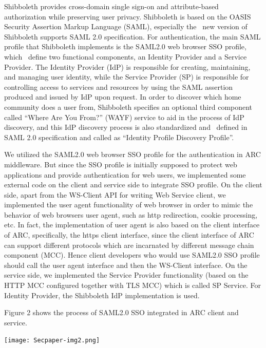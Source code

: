 \documentclass{article}
\begin{document}
Shibboleth provides cross-domain single sign-on and attribute-based
authorization while preserving user privacy. Shibboleth is based on the
OASIS Security Assertion Markup Language (SAML), especially the \ new
version of Shibboleth supports SAML 2.0 specification. For
authentication, the main SAML profile that Shibboleth implements is the
SAML2.0 web browser SSO profile, which \ define two functional
components, an Identity Provider and a Service Provider. The Identity
Provider (IdP) is responsible for creating, maintaining, and managing
user identity, while the Service Provider (SP) is responsible for
controlling access to services and resources by using the SAML
assertion produced and issued by IdP upon request. In order to discover
which home community does a user from, Shibboleth specifies an optional
third component called {\textquotedblleft}Where Are You
From?{\textquotedblright} (WAYF) service to aid in the process of IdP
discovery, and this IdP discovery process is also standardized and
\ defined in SAML 2.0 specification and called as
{\textquotedblleft}Identity Profile Discovery
Profile{\textquotedblright}.

We utilized the SAML2.0 web browser SSO profile for the authentication
in ARC middleware. But since the SSO profile is initially supposed to
protect web applications and provide authentication for web users, we
implemented some external code on the client and service side to
integrate SSO profile. On the client side, apart from the WS-Client API
for writing Web Service client, we implemented the user agent
functionality of web browser in order to mimic the behavior of web
browser{\textquotesingle}s user agent, such as http redirection, cookie
processing, etc. In fact, the implementation of user agent is also
based on the client interface of ARC, specifically, the https client
interface, since the client interface of ARC can support different
protocols which are incarnated by different message chain component
(MCC). Hence client developers who would use SAML2.0 SSO profile should
call the user agent interface and then the WS-Client interface. On the
service side, we implemented the Service Provider functionality (based
on the HTTP MCC configured together with TLS MCC) which is called SP
Service. For Identity Provider, the Shibboleth IdP implementation is
used.

Figure 2 shows the process of SAML2.0 SSO integrated in ARC client and
service.



\begin{center}
\texttt{[image: Secpaper-img2.png]}
\end{center}
\end{document}
